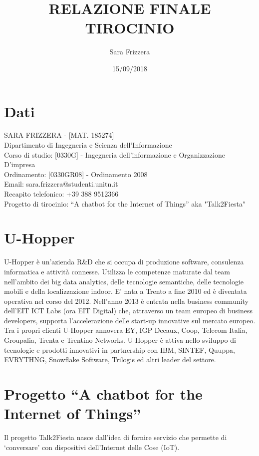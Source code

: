 \documentclass[a4paper,11pt]{article}
\theoremstyle{plain}
\begin{document}
\title{\huge RELAZIONE FINALE TIROCINIO}
\author{Sara Frizzera}
\date{15/09/2018}
\maketitle

\section*{Dati}
SARA FRIZZERA - [MAT. 185274]\\
Dipartimento di Ingegneria e Scienza dell’Informazione\\
Corso di studio:	[0330G] - Ingegneria dell'informazione e Organizzazione D'impresa\\
Ordinamento: [0330GR08] - Ordinamento 2008\\
Email: sara.frizzera@studenti.unitn.it\\
Recapito telefonico: +39 388 9512366\\
Progetto di tirocinio: “A chatbot for the Internet of Things” aka "Talk2Fiesta"

\section*{U-Hopper}
U-Hopper è un'azienda R\&D che si occupa di produzione software, consulenza informatica e attività connesse.
Utilizza le competenze maturate dal team nell’ambito dei big data analytics, delle tecnologie semantiche, delle tecnologie mobili e della localizzazione indoor.
E' nata a Trento a fine 2010 ed è diventata operativa nel corso del 2012. Nell’anno 2013 è entrata nella business community dell’EIT ICT Labs (ora EIT Digital) che, attraverso un team europeo di business developers, supporta l'accelerazione delle start-up innovative sul mercato europeo.
Tra i propri clienti U-Hopper annovera EY, IGP Decaux, Coop, Telecom Italia, Groupalia, Trenta e Trentino Networks. U-Hopper è attiva nello sviluppo di tecnologie e prodotti innovativi in partnership con IBM, SINTEF, Quuppa, EVRYTHNG, Snowflake Software, Trilogis ed altri leader del settore.

\section*{Progetto “A chatbot for the Internet of Things”}

Il progetto Talk2Fiesta nasce dall'idea di fornire servizio che permette di `conversare' con dispositivi dell'Internet delle Cose (IoT). 
\end{document}
